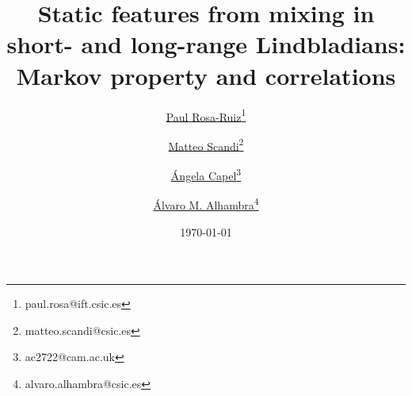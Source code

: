 \documentclass[11pt]{article}
\numberwithin{equation}{section}
\numberwithin{figure}{section}
\numberwithin{table}{section}
\theoremstyle{definition}
\theoremstyle{plain}
\theoremstyle{remark}
\begin{document}
\title{Static features from mixing in short- and long-range Lindbladians: Markov property and correlations}





\author[1]{\href{https://orcid.org/0009-0000-9555-5604}{Paul Rosa-Ruiz}\thanks{paul.rosa@ift.csic.es}}
\author[1]{\href{https://orcid.org/0000-0002-6395-3971}{Matteo Scandi}\thanks{matteo.scandi@csic.es}}
\author[2,3]{\href{https://orcid.org/0000-0001-6713-6760}{\'{A}ngela Capel}\thanks{ac2722@cam.ac.uk}}
\author[1]{\href{https://orcid.org/0000-0002-5889-4022}{\'{A}lvaro M. Alhambra}\thanks{alvaro.alhambra@csic.es}}

\date{\today}
\maketitle
\end{document}
